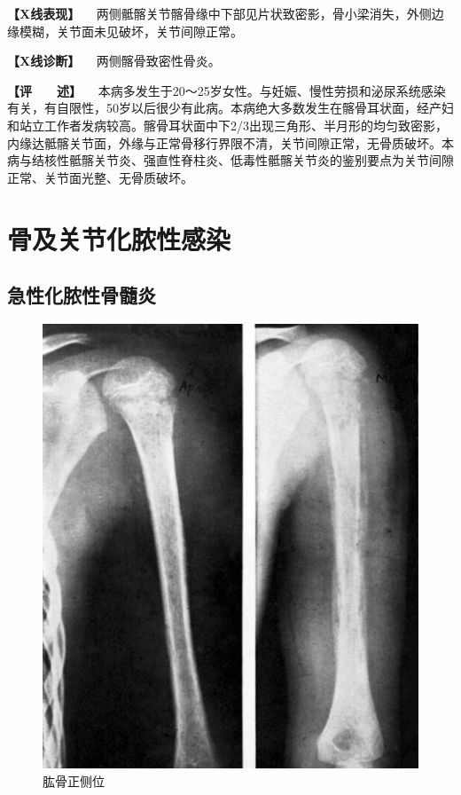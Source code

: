 \textbf{【X线表现】}
　两侧骶髂关节髂骨缘中下部见片状致密影，骨小梁消失，外侧边缘模糊，关节面未见破坏，关节间隙正常。

\textbf{【X线诊断】} 　两侧髂骨致密性骨炎。

\textbf{【评　　述】}
　本病多发生于20～25岁女性。与妊娠、慢性劳损和泌尿系统感染有关，有自限性，50岁以后很少有此病。本病绝大多数发生在髂骨耳状面，经产妇和站立工作者发病较高。髂骨耳状面中下2/3出现三角形、半月形的均匀致密影，内缘达骶髂关节面，外缘与正常骨移行界限不清，关节间隙正常，无骨质破坏。本病与结核性骶髂关节炎、强直性脊柱炎、低毒性骶髂关节炎的鉴别要点为关节间隙正常、关节面光整、无骨质破坏。

\section{骨及关节化脓性感染}

\subsection{急性化脓性骨髓炎}

\begin{figure}[!htbp]
 \centering
 \includegraphics{./images/Image00071.jpg}
 \captionsetup{justification=centering}
 \caption{肱骨正侧位}
 \label{fig2-5-1}
  \end{figure} 

